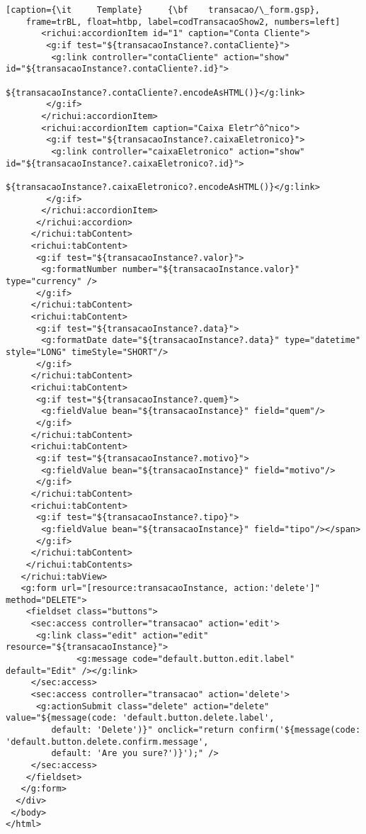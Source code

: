 \begin{lstlisting}[caption={\it     Template}     {\bf    transacao/\_form.gsp},
    frame=trBL, float=htbp, label=codTransacaoShow2, numbers=left]
       <richui:accordionItem id="1" caption="Conta Cliente">
        <g:if test="${transacaoInstance?.contaCliente}">
         <g:link controller="contaCliente" action="show" id="${transacaoInstance?.contaCliente?.id}">
                            ${transacaoInstance?.contaCliente?.encodeAsHTML()}</g:link>
        </g:if>
       </richui:accordionItem>
       <richui:accordionItem caption="Caixa Eletr^ô^nico">
        <g:if test="${transacaoInstance?.caixaEletronico}">
         <g:link controller="caixaEletronico" action="show" id="${transacaoInstance?.caixaEletronico?.id}">
                            ${transacaoInstance?.caixaEletronico?.encodeAsHTML()}</g:link>
        </g:if>
       </richui:accordionItem>
      </richui:accordion>
     </richui:tabContent>
     <richui:tabContent>
      <g:if test="${transacaoInstance?.valor}">                        
       <g:formatNumber number="${transacaoInstance.valor}" type="currency" />
      </g:if>
     </richui:tabContent>
     <richui:tabContent>
      <g:if test="${transacaoInstance?.data}">
       <g:formatDate date="${transacaoInstance?.data}" type="datetime" style="LONG" timeStyle="SHORT"/>
      </g:if>
     </richui:tabContent>
     <richui:tabContent>
      <g:if test="${transacaoInstance?.quem}">
       <g:fieldValue bean="${transacaoInstance}" field="quem"/>
      </g:if>
     </richui:tabContent>
     <richui:tabContent>
      <g:if test="${transacaoInstance?.motivo}">
       <g:fieldValue bean="${transacaoInstance}" field="motivo"/>
      </g:if>
     </richui:tabContent>
     <richui:tabContent>
      <g:if test="${transacaoInstance?.tipo}">
       <g:fieldValue bean="${transacaoInstance}" field="tipo"/></span>
      </g:if>
     </richui:tabContent>
    </richui:tabContents>
   </richui:tabView>    
   <g:form url="[resource:transacaoInstance, action:'delete']" method="DELETE">
    <fieldset class="buttons">
     <sec:access controller="transacao" action='edit'>
      <g:link class="edit" action="edit" resource="${transacaoInstance}">
              <g:message code="default.button.edit.label" default="Edit" /></g:link>
     </sec:access>
     <sec:access controller="transacao" action='delete'>
      <g:actionSubmit class="delete" action="delete" value="${message(code: 'default.button.delete.label', 
         default: 'Delete')}" onclick="return confirm('${message(code: 'default.button.delete.confirm.message', 
         default: 'Are you sure?')}');" />
     </sec:access>
    </fieldset>
   </g:form>
  </div>
 </body>
</html>
\end{lstlisting}

